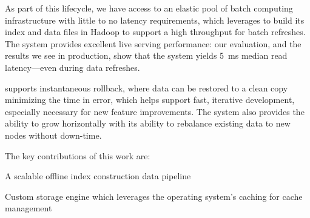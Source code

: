 As part of this lifecycle, we have access to an elastic pool of batch
computing infrastructure with little to no latency requirements, which
\projectname{} leverages to build its index and data files in Hadoop
to support a high throughput for batch refreshes. The system provides
excellent live serving performance: our evaluation, and the results we
see in production, show that the system yields 5~ms median read
latency---even during data refreshes. 

\projectname{} supports instantaneous rollback, where data can be
restored to a clean copy minimizing the time in error, which helps
support fast, iterative development, especially necessary for new
feature improvements. The system also provides the ability to grow
horizontally with its ability to rebalance existing data to new nodes
without down-time. 

The key contributions of this work are:
\begin{compactitem}
\item A scalable offline index construction data pipeline 
\item Custom storage engine which leverages the operating system's
caching for cache management
\end{compactitem}

